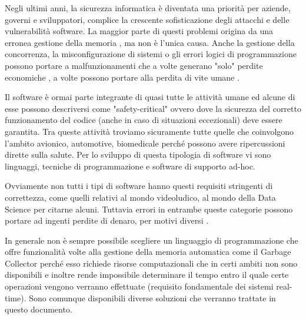 Negli ultimi anni, la sicurezza informatica è diventata una priorità per aziende, governi e sviluppatori, complice la crescente sofisticazione degli attacchi e delle vulnerabilità software. La maggior parte di questi problemi origina da una erronea gestione della memoria \cite{MemoryProblems}, ma non è l'unica causa. Anche la gestione della concorrenza, la misconfigurazione di sistemi o gli errori logici di programmazione possono portare a malfunzionamenti che a volte generano "solo" perdite economiche \cite{WikiCrowdStrike}, a volte possono portare alla perdita di vite umane \cite{Therac-25}.


Il software è ormai parte integrante di quasi tutte le attività umane ed alcune di esse possono descriversi come "safety-critical" ovvero dove la sicurezza del corretto funzionamento del codice (anche in caso di situazioni eccezionali) deve essere garantita. Tra queste attività troviamo sicuramente tutte quelle che coinvolgono l'ambito avionico, automotive, biomedicale perché possono avere ripercussioni dirette sulla salute. Per lo sviluppo di questa tipologia di software vi sono linguaggi, tecniche di programmazione e software di supporto ad-hoc.


Ovviamente non tutti i tipi di software hanno questi requisiti stringenti di correttezza, come quelli relativi al mondo videoludico, al mondo della Data Science per citarne alcuni. Tuttavia errori in entrambe queste categorie possono portare ad ingenti perdite di denaro, per motivi diversi \cite{NintendoLooseMoney} \cite{LondonWhale}. 


In generale non è sempre possibile scegliere un linguaggio di programmazione che offre funzionalità volte alla gestione della memoria automatica come il Garbage Collector perché esso richiede risorse computazionali che in certi ambiti non sono disponibili e inoltre rende impossibile determinare il tempo entro il quale certe operazioni vengono verranno effettuate (requisito fondamentale dei sistemi real-time). Sono comunque disponibili diverse soluzioni che verranno trattate in questo documento.



